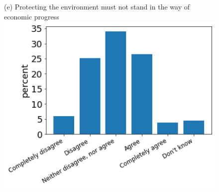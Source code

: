 \documentclass[12pt]{article}
\begin{document}
\begin{figure}[h!!]
\begin{minipage}[h!!]{0.32\textwidth}
\end{minipage}		
\begin{minipage}[h!!]{0.32\textwidth}  
\centering\footnotesize{(e) Protecting the environment must not stand in the way of economic progress}
\includegraphics[width=1\textwidth]{../codding_data/results/liss/qk20a180title0.png}
\end{minipage}	
\end{figure}
\end{document}
